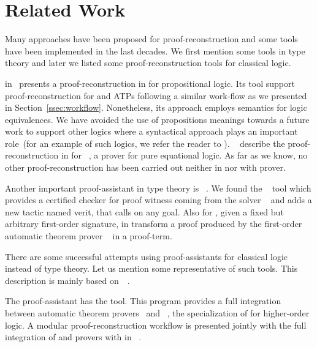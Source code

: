 \documentclass[../main.tex]{subfiles}
\begin{document}

\section{Related Work}
\label{sec:related-work}

Many approaches have been proposed for proof-reconstruction and some tools have
been implemented in the last decades. We first mention some tools in type
theory and later we listed some proof-reconstruction tools for classical logic.

\citeauthor{Kanso2012} in~\cite{Kanso2012,kanso2016light} presents a
proof-reconstruction in \Agda for propositional logic. Its tool support
proof-reconstruction for  and  ATPs following a similar work-flow as we presented in Section~\ref{ssec:workflow}.
Nonetheless, its approach
employs semantics for logic equivalences. We have avoided the use of
propositions meanings towards a future work to support other logics where a
syntactical approach plays an important role~(for an example of such logics, we
refer the reader to \cite{Agudelo-Agudelo2017}).
\citeauthor{foster2011integrating}~\cite{foster2011integrating} describe  the
proof-reconstruction in \Agda for ~\cite{hillenbrand1997}, a
prover for pure equational logic. As far as we know, no other
proof-reconstruction has been carried out neither in \Agda nor with \Metis prover.

Another important proof-assistant in type theory is ~\cite{coqteam}.
We found the ~\cite{armand2011,Ekici2017} tool which provides a
certified checker for proof witness coming from the \SMT solver
~\cite{bouton2009} and adds a new tactic named verit, that calls
 on any  goal. Also for , given a fixed but
arbitrary first-order signature, \citeauthor{Bezem2002} in \cite{Bezem2002}
transform a proof produced by the first-order automatic theorem prover
~\cite{deNivelle2003} in a  proof-term.

There are some successful attempts using proof-assistants for classical logic
instead of type theory.
Let us mention some representative of such tools. This description is
mainly based on~\citeauthor{Sicard-Ramirez2016}~\cite{Sicard-Ramirez2016}.

The  proof-assistant has the  tool.
This program provides a full integration between
automatic theorem provers~\cite{blanchette2013extending,Fleury2014,bohme2010} and
~\cite{nipkow2002isabelle}, the specialization of
 for higher-order logic.
A modular proof-reconstruction workflow is presented jointly with
the full integration of  and  provers with
 in \citeauthor{Een2004}~\cite{Een2004}.
\end{document}
